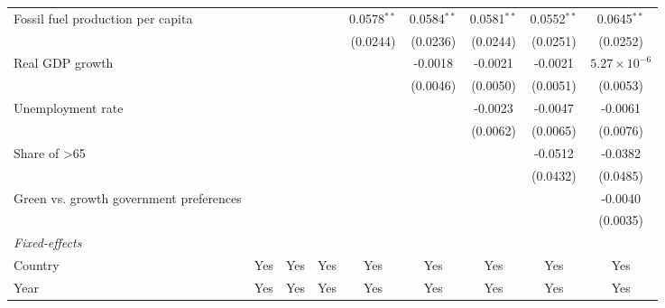 \begin{table}[htbp]
\begin{tabular}{lcccccccc}
      Fossil fuel production per capita                       &                &          &          & 0.0578$^{**}$ & 0.0584$^{**}$ & 0.0581$^{**}$ & 0.0552$^{**}$ & 0.0645$^{**}$\\   
                                                              &                &          &          & (0.0244)      & (0.0236)      & (0.0244)      & (0.0251)      & (0.0252)\\   
      Real GDP growth                                         &                &          &          &               & -0.0018       & -0.0021       & -0.0021       & $5.27\times 10^{-6}$\\    
                                                              &                &          &          &               & (0.0046)      & (0.0050)      & (0.0051)      & (0.0053)\\   
      Unemployment rate                                       &                &          &          &               &               & -0.0023       & -0.0047       & -0.0061\\   
                                                              &                &          &          &               &               & (0.0062)      & (0.0065)      & (0.0076)\\   
      Share of >65                                            &                &          &          &               &               &               & -0.0512       & -0.0382\\   
                                                              &                &          &          &               &               &               & (0.0432)      & (0.0485)\\   
      Green vs. growth government preferences                 &                &          &          &               &               &               &               & -0.0040\\   
                                                              &                &          &          &               &               &               &               & (0.0035)\\   
      \midrule
      \emph{Fixed-effects}\\
      Country                                                 & Yes            & Yes      & Yes      & Yes           & Yes           & Yes           & Yes           & Yes\\  
      Year                                                    & Yes            & Yes      & Yes      & Yes           & Yes           & Yes           & Yes           & Yes\\  

\end{tabular}
\end{table}
